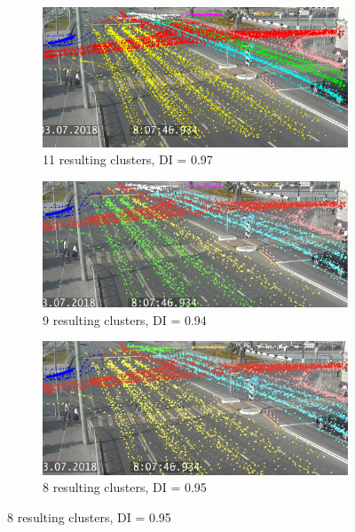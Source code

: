 \begin{figure}[!htb]
	\centering
	\begin{subfigure}[!htb]{0.495\textwidth}
		\centering{}
		\includegraphics[width=\textwidth]{images/11cl-di-1.jpeg}
		\caption{11 resulting clusters, DI = 0.97}
		\label{fig:11cl-di-1}
	\end{subfigure}
	\hfill
	\begin{subfigure}[!htb]{0.495\textwidth}
		\centering{}
		\includegraphics[width=\textwidth]{images/9cl-di-1.jpeg}
		\caption{9 resulting clusters, DI = 0.94}
		\label{fig:9cl-di-1}
	\end{subfigure}
	\hfill
	\begin{subfigure}[!htb]{0.495\textwidth}
		\centering{}
		\includegraphics[width=\textwidth]{images/8cl-di-1.jpeg}
		\caption{8 resulting clusters, DI = 0.95}
		\label{fig:8cl-di-1}

\end{subfigure}
\end{figure}
